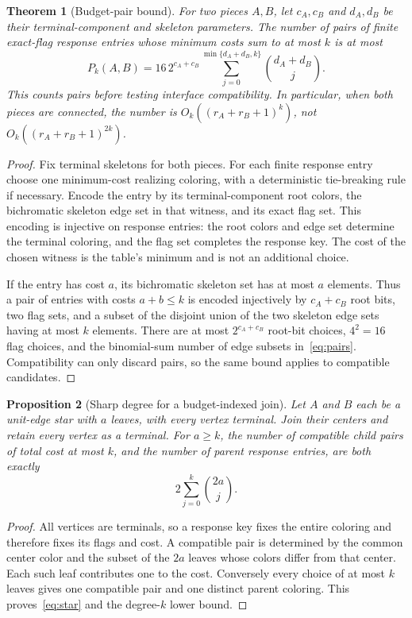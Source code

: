 \documentclass[11pt,a4paper]{article}
\newtheorem{theorem}{Theorem}[section]
\newtheorem{proposition}[theorem]{Proposition}
\theoremstyle{definition}
\theoremstyle{remark}
\newcommand{\bk}[2]{\sum_{j=0}^{\min\{#1,#2\}}\binom{#1}{j}}
\begin{document}
\begin{theorem}[Budget-pair bound]
\label{thm:pairs}
For two pieces $A,B$, let $c_A,c_B$ and $d_A,d_B$ be their terminal-component and skeleton parameters. The number of pairs of finite exact-flag response entries whose minimum costs sum to at most $k$ is at most
\[
 P_k(A,B)=16\,2^{c_A+c_B}\bk{d_A+d_B}{k}.
 \tag{3}\label{eq:pairs}
\]
This counts pairs before testing interface compatibility. In particular, when both pieces are connected, the number is $O_k((r_A+r_B+1)^k)$, not $O_k((r_A+r_B+1)^{2k})$.
\end{theorem}
\begin{proof}
Fix terminal skeletons for both pieces. For each finite response entry choose one minimum-cost realizing coloring, with a deterministic tie-breaking rule if necessary. Encode the entry by its terminal-component root colors, the bichromatic skeleton edge set in that witness, and its exact flag set. This encoding is injective on response entries: the root colors and edge set determine the terminal coloring, and the flag set completes the response key. The cost of the chosen witness is the table's minimum and is not an additional choice.

If the entry has cost $a$, its bichromatic skeleton set has at most $a$ elements. Thus a pair of entries with costs $a+b\le k$ is encoded injectively by $c_A+c_B$ root bits, two flag sets, and a subset of the disjoint union of the two skeleton edge sets having at most $k$ elements. There are at most $2^{c_A+c_B}$ root-bit choices, $4^2=16$ flag choices, and the binomial-sum number of edge subsets in~\eqref{eq:pairs}. Compatibility can only discard pairs, so the same bound applies to compatible candidates.
\end{proof}

\begin{proposition}[Sharp degree for a budget-indexed join]
\label{prop:pairstar}
Let $A$ and $B$ each be a unit-edge star with $a$ leaves, with every vertex terminal. Join their centers and retain every vertex as a terminal. For $a\ge k$, the number of compatible child pairs of total cost at most $k$, and the number of parent response entries, are both exactly
\[
 2\sum_{j=0}^{k}\binom{2a}{j}.
 \tag{4}\label{eq:star}
\]
\end{proposition}
\begin{proof}
All vertices are terminals, so a response key fixes the entire coloring and therefore fixes its flags and cost. A compatible pair is determined by the common center color and the subset of the $2a$ leaves whose colors differ from that center. Each such leaf contributes one to the cost. Conversely every choice of at most $k$ leaves gives one compatible pair and one distinct parent coloring. This proves~\eqref{eq:star} and the degree-$k$ lower bound.
\end{proof}
\end{document}
